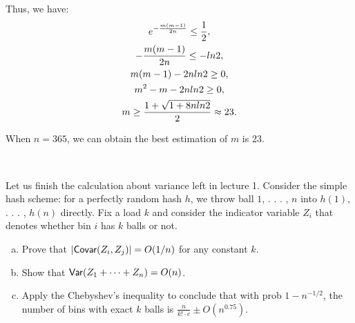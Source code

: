 \begin{problem}
Thus, we have:
\begin{gather*}
e^{-\frac{m(m-1)}{2n}} \le \frac{1}{2}, \\ \notag
-\frac{m(m-1)}{2n} \le -ln2, \\
m(m - 1) - 2n ln 2 \ge 0, \\
m^2 - m - 2n ln 2 \ge 0, \\
m \ge \frac{1 + \sqrt{1 + 8n ln2}}{2} \approx 23.\\
\end{gather*}

When $n = 365$, we can obtain the best estimation of $m$ is 23.
\end{problem}

~\\
\begin{problem}[20 points.]
Let us finish the calculation about variance left in lecture 1. Consider the simple hash scheme: for a perfectly random hash $h$, we throw ball $1$, . . . , $n$ into $h(1)$, . . . , $h(n)$ directly. Fix a load $k$ and consider the indicator variable $Z_i$ that denotes whether bin $i$ has $k$ balls or not.

\begin{enumerate}[(a)]
\item Prove that $|\mathsf{Covar}(Z_i,Z_j)|=O(1/n)$ for any constant $k$.

\Answer

\item Show that $ \mathsf{Var} (Z_1 + \dots+Z_n)=O(n)$.

\Answer

\item Apply the Chebyshev's inequality to conclude that with prob $1-n^{-1/2}$, the number of bins with exact $k$ balls is $\frac{n}{k! \cdot e } ± O(n^{0.75})$.

\Answer

\end{enumerate}
\end{problem}

~\\

